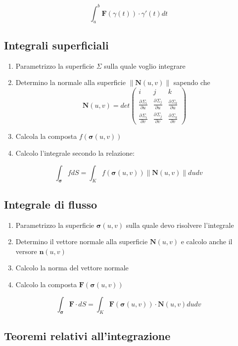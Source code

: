 \documentclass[10pt,a4paper]{report}
\newcommand{\pdv}[3]{\frac{\partial^{#2} #1}{\partial #3^{#2}}}
\newcommand{\norm}[1]{ \left\lVert {#1} \right\rVert}
\begin{document}
		\[ \int_{a}^{b} \mathbf{F}(\gamma (t)) \cdot \gamma '(t) dt \]
		
		\subsection*{Integrali \textbf{superficiali}}
			\begin{enumerate}
				\item Parametrizzo la superficie $ \Sigma $ sulla quale voglio integrare
				\item Determino la normale alla superficie $\norm{\mathbf{N}(u,v)} $ sapendo che \\
                \[ \mathbf{N}(u,v) = det \left(\begin{array}{ccc} i & j & k\\ \pdv{\Sigma_{i} }{}{u} & \pdv{\Sigma_{j}}{}{u} & \pdv{\Sigma_{k}}{}{u} \\ \pdv{\Sigma_{i}}{}{v} & \pdv{\Sigma_{j}}{}{v} & \pdv{\Sigma_{k}}{}{v} \end{array}\right) \]
				\item Calcola la composta $f(\mathbf{\sigma} (u,v))$
				\item Calcolo l'integrale secondo la relazione:
			\end{enumerate}
		\[ \int_{\mathbf{\sigma}} fdS = \int_{K} f(\mathbf{\sigma} (u,v)) \norm{\mathbf{N}(u,v)}dudv \]
		
		\subsection*{Integrale di \textbf{flusso}}
		
		\begin{enumerate}
			\item Parametrizzo la superficie $ \mathbf{\sigma}(u,v) $ sulla quale devo risolvere l'integrale 
			\item Determino il vettore normale alla superficie $ \mathbf{N}(u,v) $ e calcolo anche il versore $ \mathbf{n}(u,v) $
			\item Calcolo la norma del vettore normale 
			\item Calcolo la composta $ \mathbf{F}(\mathbf{\sigma}(u,v)) $
		\end{enumerate}
		
		\[  \int_{\mathbf{\sigma}} \mathbf{F} \cdot dS = \int_{K} \mathbf{F}(\mathbf{\sigma}(u,v)) \cdot \mathbf{N}(u,v) dudv\]
		
		\subsection*{Teoremi relativi all'integrazione}
		
\end{document}
